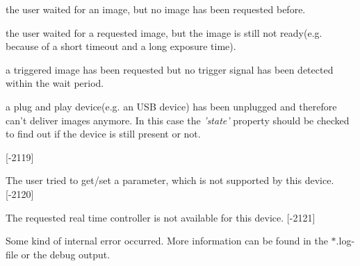 \begin{Desc}
\begin{description}
\begin{DoxyItemize}
\item the user waited for an image, but no image has been requested before.
\item the user waited for a requested image, but the image is still not ready(e.\+g. because of a short timeout and a long exposure time).
\item a triggered image has been requested but no trigger signal has been detected within the wait period.
\item a plug and play device(e.\+g. an U\+S\+B device) has been unplugged and therefore can't deliver images anymore. In this case the {\itshape 'state'} property should be checked to find out if the device is still present or not.
\end{DoxyItemize}

{\bfseries }\mbox{[}-\/2119\mbox{]} \item[{\em 
\hypertarget{group___common_interface_gga112225e5fbaaaef6445ff4ebf98f8e03a339b14cc20582bc8a4992fb259c0f31a}{D\+E\+V\+\_\+\+U\+N\+S\+U\+P\+P\+O\+R\+T\+E\+D\+\_\+\+P\+A\+R\+A\+M\+E\+T\+E\+R}\label{group___common_interface_gga112225e5fbaaaef6445ff4ebf98f8e03a339b14cc20582bc8a4992fb259c0f31a}
}]The user tried to get/set a parameter, which is not supported by this device. {\bfseries }\mbox{[}-\/2120\mbox{]} \item[{\em 
\hypertarget{group___common_interface_gga112225e5fbaaaef6445ff4ebf98f8e03abb9d31b8b0e177274dcb06d9265fc1c2}{D\+E\+V\+\_\+\+I\+N\+V\+A\+L\+I\+D\+\_\+\+R\+T\+C\+\_\+\+N\+U\+M\+B\+E\+R}\label{group___common_interface_gga112225e5fbaaaef6445ff4ebf98f8e03abb9d31b8b0e177274dcb06d9265fc1c2}
}]The requested real time controller is not available for this device. {\bfseries }\mbox{[}-\/2121\mbox{]} \item[{\em 
\hypertarget{group___common_interface_gga112225e5fbaaaef6445ff4ebf98f8e03aa9586c483d3227fdbc0506b3f3fa22b5}{D\+M\+R\+\_\+\+I\+N\+T\+E\+R\+N\+A\+L\+\_\+\+E\+R\+R\+O\+R}\label{group___common_interface_gga112225e5fbaaaef6445ff4ebf98f8e03aa9586c483d3227fdbc0506b3f3fa22b5}
}]Some kind of internal error occurred. More information can be found in the $\ast$.log-\/file or the debug output.


\end{description}
\end{Desc}
